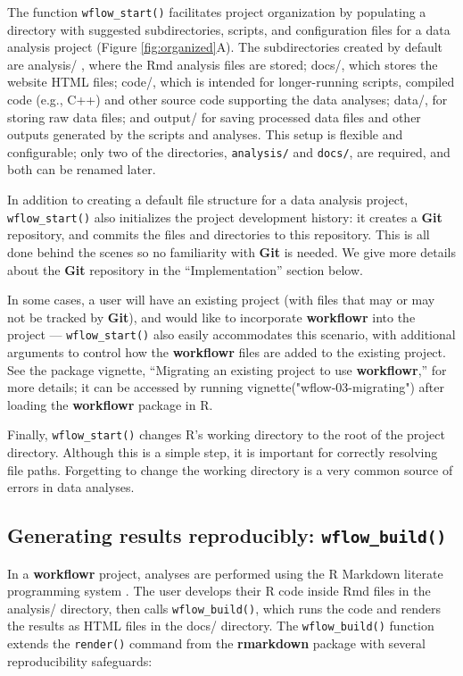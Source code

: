 \documentclass[9pt,a4paper]{extarticle}
\begin{document}
The function \texttt{wflow\_start()} facilitates project organization by
populating a directory with suggested subdirectories, scripts, and
configuration files for a data analysis project (Figure \ref{fig:organized}A). The
subdirectories created by default are analysis/ , where the Rmd analysis
files are stored; docs/, which stores the website HTML files; code/,
which is intended for longer-running scripts, compiled code (e.g., C++)
and other source code supporting the data analyses; data/, for storing
raw data files; and output/ for saving processed data files and other
outputs generated by the scripts and analyses. This setup is flexible
and configurable; only two of the directories, \verb|analysis/| and
\verb|docs/|, are required, and both can be renamed later.

In addition to creating a default file structure for a data analysis
project, \texttt{wflow\_start()} also initializes the project development history:
it creates a \textbf{Git} repository, and commits the files and directories to
this repository. This is all done behind the scenes so no familiarity
with \textbf{Git} is needed. We give more details about the \textbf{Git} repository in the
``Implementation'' section below.

In some cases, a user will have an existing project (with files that may
or may not be tracked by \textbf{Git}), and would like to incorporate \textbf{workflowr}
into the project --- \texttt{wflow\_start()} also easily accommodates this
scenario, with additional arguments to control how the \textbf{workflowr} files
are added to the existing project. See the package vignette, ``Migrating
an existing project to use \textbf{workflowr},'' for more details; it can be
accessed by running vignette("wflow-03-migrating") after loading the
 \textbf{workflowr} package in R.

Finally, \texttt{wflow\_start()} changes R’s working directory to the root of the
project directory. Although this is a simple step, it is important for
correctly resolving file paths. Forgetting to change the working
directory is a very common source of errors in data analyses.

\subsection*{Generating results reproducibly: \texttt{wflow\_build()}}

In a \textbf{workflowr} project, analyses are performed using the R Markdown
literate programming system \cite{Xie2018}. The user develops their R
code inside Rmd files in the analysis/ directory, then calls
\texttt{wflow\_build()}, which runs the code and renders the results as HTML files
in the docs/ directory. The \texttt{wflow\_build()} function extends the \texttt{render()}
command from the \textbf{rmarkdown} package with several reproducibility
safeguards:
\end{document}
